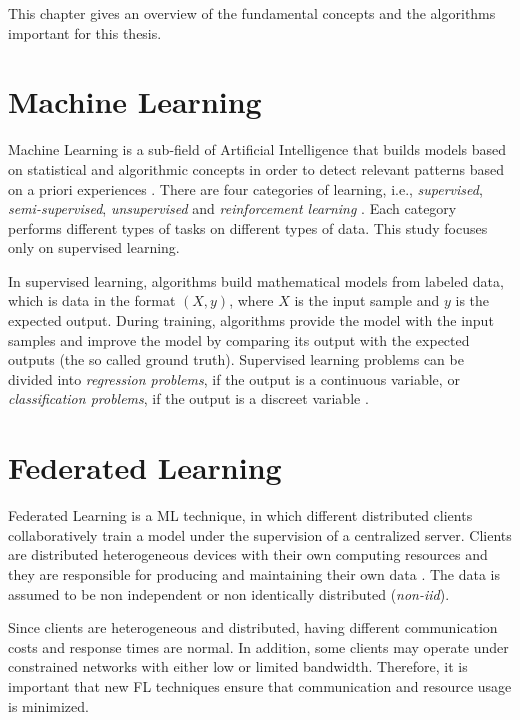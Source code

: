 This chapter gives an overview of the fundamental concepts and the algorithms important for this thesis.

\section{Machine Learning}\label{background:machine_learning}

Machine Learning is a sub-field of Artificial Intelligence that builds models based on statistical and algorithmic concepts in order to detect relevant patterns based on a priori experiences \cite{geron_2019}. There are four categories of learning, i.e., \textit{supervised}, \textit{semi-supervised}, \textit{unsupervised} and \textit{reinforcement learning} \cite{Sarker2021}. Each category performs different types of tasks on different types of data. This study focuses only on supervised learning.


In supervised learning, algorithms build mathematical models from labeled data, which is data in the format $(X, y)$, where $X$ is the input sample and $y$ is the expected output. During training, algorithms provide the model with the input samples and improve the model by comparing its output with the expected outputs (the so called ground truth). Supervised learning problems can be divided into \textit{regression problems}, if the output is a continuous variable, or \textit{classification problems}, if the output is a discreet variable \cite{Sarker2021}.

\section{Federated Learning}\label{background:federated_learning}

Federated Learning is a ML technique, in which different distributed clients collaboratively train a model under the supervision of a centralized server. Clients are distributed heterogeneous devices with their own computing resources and they are responsible for producing and maintaining their own data \cite{9084352}. The data is assumed to be non independent or non identically distributed (\textit{non-iid}).

Since clients are heterogeneous and distributed, having different communication costs and response times are normal. In addition, some clients may operate under constrained networks with either low or limited bandwidth. Therefore, it is important that new FL techniques ensure that communication and resource usage is minimized.

